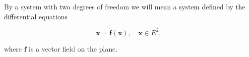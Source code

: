 By a system with two degrees of freedom we will mean a system defined by the differential equations

$$\ddot{\mathbf{x}} = \mathbf{f}(\mathbf{x}), \quad \mathbf{x} \in E^2,$$

where $\mathbf{f}$ is a vector field on the plane.
